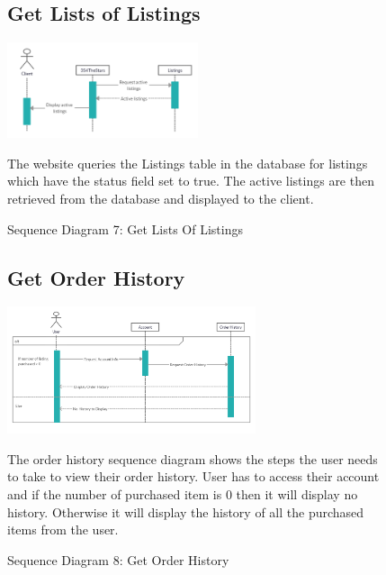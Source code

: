 \documentclass[11pt]{article}
\newcounter{use case ID}
\begin{document}
\begin{figure}[ht!]
    \subsection{Get Lists of Listings}
    \centering
    \includegraphics[width=0.5\textwidth,height=0.15\paperheight]{Diagrams/Sequence/Lists_of_Listings.jpg}
    \caption{Sequence Diagram 7: Get Lists Of Listings}
    \label{fig: Get Lists Of Listings}
    \begin{flushleft}
        The website queries the Listings table in the database for listings which have the status field set to true. The active listings are then retrieved from the database and displayed to the client.
    \end{flushleft}
\end{figure}

\begin{figure}[ht!]
    \subsection{Get Order History}
    \centering
    \includegraphics[width=0.65\textwidth,height=0.2\paperheight]{Diagrams/Sequence/Order_History.png} 
    \caption{Sequence Diagram 8: Get Order History}
    \label{fig: Get Order History}
    \begin{flushleft}
       The order history sequence diagram shows the steps the user needs to take to view their order history. User has to access their account and if the number of purchased item is 0 then it will display no history. Otherwise it will display the history of all the purchased items from the user. 
    \end{flushleft}
\end{figure}
\end{document}
